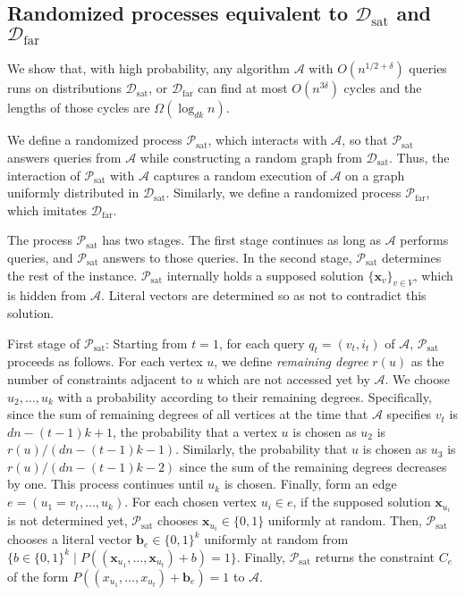 \documentclass[letterpaper,11pt]{article}
\newcommand{\calpsat}{\mathcal{P}_{\mathrm{sat}}}
\newcommand{\calpfar}{\mathcal{P}_{\mathrm{far}}}
\newcommand{\caldsat}{\mathcal{D}_{\mathrm{sat}}}
\newcommand{\caldfar}{\mathcal{D}_{\mathrm{far}}}
\newcommand{\cala}{\mathcal{A}}
\newcommand{\bfx}{\mathbf{x}}
\newcommand{\bfb}{\mathbf{b}}
\newcommand{\bit}{\{0,1\}}
\begin{document}
\subsection{Randomized processes equivalent to $\caldsat$ and $\caldfar$}
We show that, with high probability,
any algorithm $\cala$ with $O(n^{1/2+\delta})$ queries runs on distributions $\caldsat$, or $\caldfar$ can find at most $O(n^{3\delta})$ cycles and the lengths of those cycles are $\Omega(\log_{dk}n)$.

We define a randomized process $\calpsat$, which interacts with $\cala$, 
so that $\calpsat$ answers queries from $\cala$ while constructing a random graph from $\caldsat$.
Thus, the interaction of $\calpsat$ with $\cala$ captures a random execution of $\cala$ on a graph uniformly distributed in $\caldsat$.
Similarly, we define a randomized process $\calpfar$, which imitates $\caldfar$.

The process $\calpsat$ has two stages.
The first stage continues as long as $\cala$ performs queries, and $\calpsat$ answers to those queries.
In the second stage, $\calpsat$ determines the rest of the instance.
$\calpsat$ internally holds a supposed solution $\{\bfx_v\}_{v\in V}$, 
which is hidden from $\cala$.
Literal vectors are determined so as not to contradict this solution.

First stage of $\calpsat$:
Starting from $t=1$, 
for each query $q_t=(v_t,i_t)$ of $\cala$, $\calpsat$ proceeds as follows.
For each vertex $u$, 
we define \textit{remaining degree} $r(u)$ as the number of constraints adjacent to $u$ which are not accessed yet by $\cala$.
We choose $u_2,\ldots,u_k$ with a probability according to their remaining degrees.
Specifically, 
since the sum of remaining degrees of all vertices at the time that $\cala$ specifies $v_t$ is $dn-(t-1)k+1$,
the probability that a vertex $u$ is chosen as $u_2$ is \( r(u)/(dn-(t-1)k-1) \).
Similarly, the probability that $u$ is chosen as $u_3$ is \( r(u)/(dn-(t-1)k-2) \) since the sum of the remaining degrees decreases by one.
This process continues until $u_k$ is chosen.
Finally, form an edge $e=(u_1=v_t,\ldots,u_k)$.
For each chosen vertex $u_i\in e$, 
if the supposed solution $\bfx_{u_i}$ is not determined yet,
$\calpsat$ chooses $\bfx_{u_i}\in \bit$ uniformly at random.
Then, $\calpsat$ chooses a literal vector $\bfb_e\in \bit^k$ uniformly at random from \( \{ b\in \bit^k \mid P((\bfx_{u_1},\ldots,\bfx_{u_t})+b)=1\}  \).
Finally, $\calpsat$ returns the constraint $C_e$ of the form $P((x_{u_1},\ldots,x_{u_t})+\bfb_e)=1$ to $\cala$.
\end{document}
